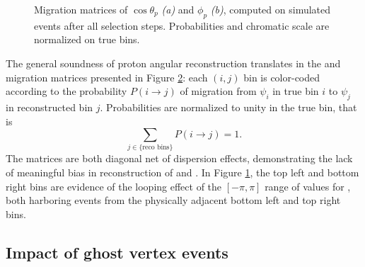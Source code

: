 \begin{figure}[t]
\begin{subfigure}{.45\textwidth}
		\caption{}
		\label{fig:5:MCRECO_p_phi_migration}
	\end{subfigure}
	\caption{Migration matrices of $\cos\theta_p$ \textit{(a)} and $\phi_p$ \textit{(b)}, computed on simulated \demonstratorshort events after all selection steps. Probabilities and chromatic scale are normalized on true bins.}
	\label{fig:5:angular_migration_matrices}
\end{figure}

The general soundness of proton angular reconstruction translates in the \cthetap and \phip migration matrices presented in Figure \ref{fig:5:angular_migration_matrices}:
each $(i,j)$ bin is color-coded according to the probability $P(i \rightarrow j)$ of migration from $\psi_i$ in true bin $i$ to $\psi_j$ in reconstructed bin $j$. Probabilities are normalized to unity in the true bin, that is
\begin{equation}
	\sum_{j \in \{ \text{reco bins} \}} P(i\rightarrow j) = 1.
\end{equation}
The matrices are both diagonal net of dispersion effects, demonstrating the lack of meaningful bias in reconstruction of \cthetap and \phip.
In Figure \ref{fig:5:MCRECO_p_phi_migration}, the top left and bottom right bins are evidence of the looping effect of the $[-\pi,\pi]$ range of values for \phip, both harboring events from the physically adjacent bottom left and top right bins.

\subsection{Impact of ghost vertex events}
\label{sec:5:resolution_after_ghost}

